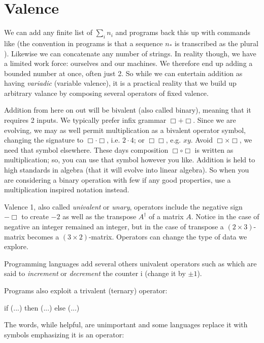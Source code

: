
\section{Valence}
We can add any finite list of $\sum_{i} n_i$ and 
programs back this up with commands like  
(the convention in programs is that a sequence $n_*$ is transcribed as 
the plural ).  Likewise we can concatenate any 
number of strings.  In reality though, we have a limited work force:
ourselves and our machines. We therefore end up adding a bounded number at once,
often just 2.  So while we can entertain addition as having 
\emph{variadic} (variable valence), it is a practical reality that 
we build up arbitrary valance by composing several operators of 
fixed valence.

Addition from here on out will be bivalent (also called binary), meaning 
that it requires 2 inputs.  We typically prefer infix grammar $\Box +\Box$.
Since we are evolving, we may as well permit multiplication as a bivalent operator
symbol, changing the signature to $\Box \cdot \Box$, i.e. $2\cdot 4$; or
$\Box\Box$, e.g. $xy$.   Avoid $\Box\times \Box$, we need that symbol elsewhere.
These days composition $\Box\circ\Box$ is written as multiplication; so, you can
use that symbol however you like.  Addition is held to high standards in algebra
(that it will evolve into linear algebra).  So when you are considering a binary
operation with few if any good properties, use a multiplication inspired
notation instead.   




 Valence
1, also called \emph{univalent} or \emph{unary}, operators include the negative
sign $-\Box$ to create $-2$ as well as the transpose $A^{\dagger}$ of a matrix
$A$. Notice in the case of negative an integer remained an integer, but in the
case of transpose a $(2\times 3)$-matrix becomes a $(3\times 2)$-matrix.
Operators can change the type of data we explore.
 
Programming languages add several others univalent operators
such as  which are said to \emph{increment} 
or \emph{decrement} the counter i (change it by $\pm 1$).

Programs also exploit a trivalent (ternary) operator:
\begin{center}
\begin{Pcode}[]
if (...) then (...) else (...)
\end{Pcode}
\end{center}
The words, while helpful, are unimportant and some languages
replace it with symbols emphasizing it is an operator:
\begin{center}
\end{center}

